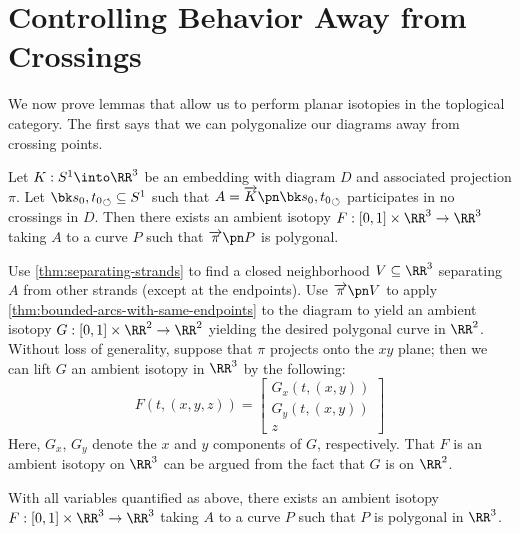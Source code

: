 \section{Controlling Behavior Away from
  Crossings}\label{sec:controlling-behavior-away-from-crossings}
We now prove lemmas that allow us to perform planar isotopies in the
toplogical category. The first says that we can polygonalize our
diagrams away from crossing points.
\begin{lemma}\label{lem:polygonalizing-strands}
  Let $K : S^1\into \RR^3$ be an embedding with diagram $D$ and
  associated projection $\pi$. Let $\sbk{s_0, t_0} \subseteq S^1$ such
  that $A = \fim{K}{\sbk{s_0, t_0}}$ participates in no crossings in
  $D$. Then there exists an ambient isotopy $F : [0,1] \times \RR^3
  \to \RR^3$ taking $A$ to a curve $P$ such that $\fim{\pi}{P}$ is
  polygonal.
\end{lemma}
\begin{sproof}[Sketch]
  Use \cref{thm:separating-strands} to find a closed neighborhood $V
  \subseteq \RR^3$ separating $A$ from other strands (except at the
  endpoints). Use $\fim{\pi}{V}$ to apply
  \cref{thm:bounded-arcs-with-same-endpoints} to the diagram to yield
  an ambient isotopy $G : [0,1] \times \RR^2 \to \RR^2$ yielding the
  desired polygonal curve in $\RR^2$. Without loss of generality,
  suppose that $\pi$ projects onto the $xy$ plane; then we can lift
  $G$ an ambient isotopy in $\RR^3$ by the following:
  \[
    F(t, (x,y,z)) =
    \begin{bmatrix}
      G_x(t, (x,y)) \\
      G_y(t, (x,y)) \\
      z
    \end{bmatrix}
  \]
  Here, $G_x$, $G_y$ denote the $x$ and $y$ components of $G$,
  respectively. That $F$ is an ambient isotopy on $\RR^3$ can be
  argued from the fact that $G$ is on $\RR^2$.
\end{sproof}
\begin{corollary}\label{cor:full-polygonalizing-strands}
  With all variables quantified as above, there exists an ambient
  isotopy $F: [0,1] \times \RR^3 \to \RR^3$ taking $A$ to a curve $P$
  such that $P$ is polygonal in $\RR^3$.
\end{corollary}
